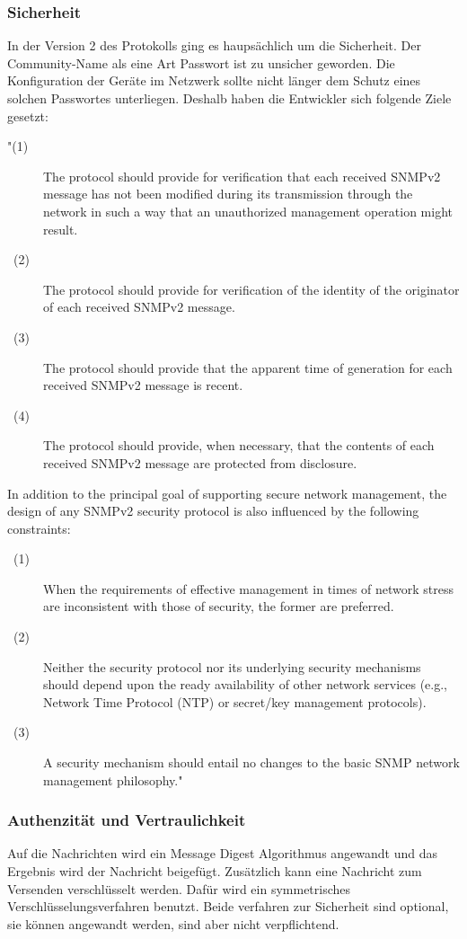 \documentclass[11pt,a4paper]{article}
\begin{document}
\subsubsection{Sicherheit}
In der Version 2 des Protokolls ging es haupsächlich um die Sicherheit. Der Community-Name als eine Art Passwort ist zu unsicher geworden. Die Konfiguration der Geräte im Netzwerk sollte nicht länger dem Schutz eines solchen Passwortes unterliegen. Deshalb haben die Entwickler sich folgende Ziele gesetzt:
\begin{description}
	\item["(1)]
	The protocol should provide for verification that each received SNMPv2 message has not been modified during its transmission through the network 	in such a way that an unauthorized management operation might result.       
	\item[\ (2)]
	The protocol should provide for verification of the identity of the originator of each received SNMPv2 message.
	\item[\ (3)]
	The protocol should provide that the apparent time of generation for each received SNMPv2 message is recent.
	\item[\ (4)]
	The protocol should provide, when necessary, that the contents of each received SNMPv2 message are protected from disclosure.
\end{description}
In addition to the principal goal of supporting secure network management, the design of any SNMPv2 security protocol is also influenced by the following constraints:
\begin{description}
	\item[\ (1)]
	When the requirements of effective management in times of network stress are inconsistent with those of security, the former are preferred.
	\item[\ (2)]
	Neither the security protocol nor its underlying security mechanisms should depend upon the ready availability of other network services (e.g., 				Network Time Protocol (NTP) or secret/key management protocols).
	\item[\ (3)]
	A security mechanism should entail no changes to the basic SNMP network management philosophy."\ 
	\cite{rfcSnmpV2Securety}\\
\end{description}

\subsubsection{Authenzität und Vertraulichkeit}
Auf die Nachrichten wird ein Message Digest Algorithmus angewandt und das Ergebnis wird der Nachricht beigefügt. Zusätzlich kann eine Nachricht zum Versenden verschlüsselt werden. Dafür wird ein symmetrisches Verschlüsselungsverfahren benutzt. Beide verfahren zur Sicherheit sind optional, sie können angewandt werden, sind aber nicht verpflichtend.\\
\end{document}
